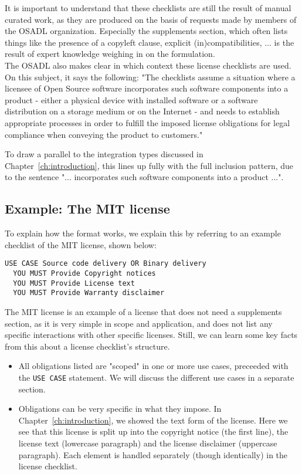 It is important to understand that these checklists are still the result of manual curated work, as they are produced on the basis of requests made by members of the OSADL organization. Especially the supplements section, which often lists things like the presence of a copyleft clause, explicit (in)compatibilities, ... is the result of expert knowledge weighing in on the formulation. \\

The OSADL also makes clear in which context these license checklists are used. On this subject, it says the following: "The checklists assume a situation where a licensee of Open Source software incorporates such software components into a product - either a physical device with installed software or a software distribution on a storage medium or on the Internet - and needs to establish appropriate processes in order to fulfill the imposed license obligations for legal compliance when conveying the product to customers."~\cite{osadl-license-checklists-scope}

To draw a parallel to the integration types discussed in Chapter~\ref{ch:introduction}, this lines up fully with the full inclusion pattern, due to the sentence "... incorporates such software components into a product ...".

\subsection{Example: The MIT license}

To explain how the format works, we explain this by referring to an example checklist of the MIT license, shown below:

\begin{verbatim}
USE CASE Source code delivery OR Binary delivery
  YOU MUST Provide Copyright notices
  YOU MUST Provide License text
  YOU MUST Provide Warranty disclaimer
\end{verbatim}

The MIT license is an example of a license that does not need a supplements section, as it is very simple in scope and application, and does not list any specific interactions with other specific licenses. Still, we can learn some key facts from this about a license checklist's structure.

\begin{itemize}
	\item All obligations listed are "scoped" in one or more use cases, preceeded with the \texttt{USE CASE} statement. We will discuss the different use cases in a separate section.
	\item Obligations can be very specific in what they impose. In Chapter~\ref{ch:introduction}, we showed the text form of the license. Here we see that this license is split up into the copyright notice (the first line), the license text (lowercase paragraph) and the license disclaimer (uppercase paragraph). Each element is handled separately (though identically) in the license checklist.
\end{itemize}


